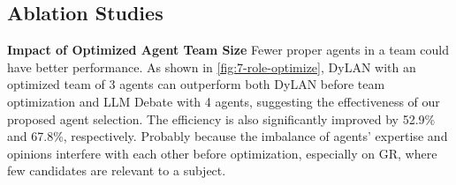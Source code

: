 \documentclass{article} %
\begin{document}
\subsection{Ablation Studies}\label{sec:more-anal}

\noindent
\textbf{Impact of Optimized Agent Team Size}
Fewer proper agents in a team could have better performance. As shown in \cref{fig:7-role-optimize}, DyLAN with an optimized team of 3 agents can outperform both DyLAN before team optimization and LLM Debate with 4 agents, suggesting the effectiveness of our proposed agent selection. The efficiency is also significantly improved by \textcolor{mydarkgreen}{52.9\%} and \textcolor{mydarkgreen}{67.8\%}, respectively. Probably because the imbalance of agents' expertise and opinions interfere with each other before optimization, especially on GR, where few candidates are relevant to a subject.

\end{document}
